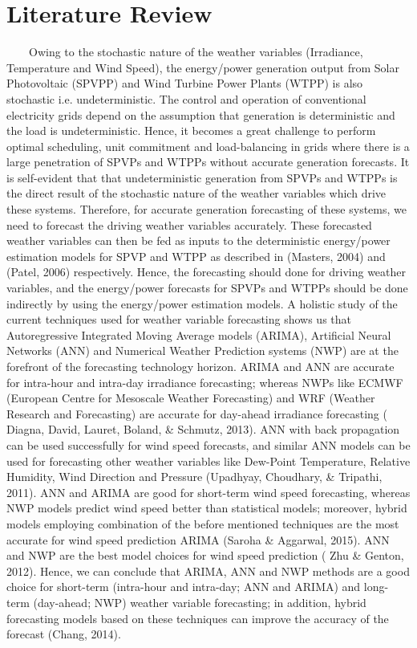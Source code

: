 \section{Literature Review}
\
\
\
\
Owing to the stochastic nature of the weather variables (Irradiance, Temperature and Wind Speed), the energy/power generation output from Solar Photovoltaic (SPVPP) and Wind Turbine Power Plants (WTPP) is also stochastic i.e. undeterministic. The control and operation of conventional electricity grids depend on the assumption that generation is deterministic and the load is undeterministic. Hence, it becomes a great challenge to perform optimal scheduling, unit commitment and load-balancing in grids where there is a large penetration of SPVPs and WTPPs without accurate generation forecasts.
It is self-evident that that undeterministic generation from SPVPs and WTPPs is the direct result of the stochastic nature of the weather variables which drive these systems. Therefore, for accurate generation forecasting of these systems, we need to forecast the driving weather variables accurately. These forecasted weather variables can then be fed as inputs to the deterministic energy/power estimation models for SPVP and WTPP as described in (Masters, 2004) and (Patel, 2006) respectively. Hence, the forecasting should done for driving weather variables, and the energy/power forecasts for SPVPs and WTPPs should be done indirectly by using the energy/power estimation models. 
A holistic study of the current techniques used for weather variable forecasting shows us that Autoregressive Integrated Moving Average models (ARIMA), Artificial Neural Networks (ANN) and Numerical Weather Prediction systems (NWP) are at the forefront of the forecasting technology horizon. ARIMA and ANN are accurate for intra-hour and intra-day irradiance forecasting; whereas NWPs like ECMWF (European Centre for Mesoscale Weather Forecasting) and WRF (Weather Research and Forecasting) are accurate for day-ahead irradiance forecasting ( Diagna, David, Lauret, Boland, & Schmutz, 2013). ANN with back propagation can be used successfully for wind speed forecasts, and similar ANN models can be used for forecasting other weather variables like Dew-Point Temperature, Relative Humidity, Wind Direction and Pressure (Upadhyay, Choudhary, & Tripathi, 2011). ANN and ARIMA are good for short-term wind speed forecasting, whereas NWP models predict wind speed better than statistical models; moreover, hybrid models employing combination of the before mentioned techniques are the most accurate for wind speed prediction ARIMA (Saroha & Aggarwal, 2015).  ANN and NWP are the best model choices for wind speed prediction ( Zhu & Genton, 2012). Hence, we can conclude that ARIMA, ANN and NWP methods are a good choice for short-term (intra-hour and intra-day; ANN and ARIMA) and long-term (day-ahead; NWP) weather variable forecasting; in addition, hybrid forecasting models based on these techniques can improve the accuracy of the forecast (Chang, 2014).\\

